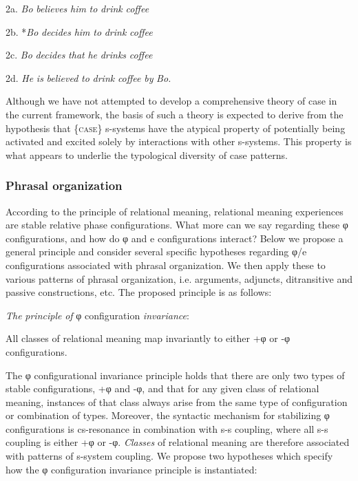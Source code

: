  2a.  \textit{Bo} \textit{believes} \textit{him} \textit{to} \textit{drink} \textit{coffee}

  2b.  *\textit{Bo} \textit{decides} \textit{him} \textit{to} \textit{drink} \textit{coffee}

  2c.  \textit{Bo} \textit{decides} \textit{that} \textit{he} \textit{drinks} \textit{coffee}

  2d.   \textit{He} \textit{is} \textit{believed} \textit{to} \textit{drink} \textit{coffee} \textit{by} \textit{Bo.}

  Although we have not attempted to develop a comprehensive theory of case in the current framework, the basis of such a theory is expected to derive from the hypothesis that \{\textsc{case}\} s-systems have the atypical property of potentially being activated and excited solely by interactions with other s-systems. This property is what appears to underlie the typological diversity of case patterns. 

\subsubsection{Phrasal organization}

According to the principle of relational meaning, relational meaning experiences are stable relative phase configurations. What more can we say regarding these φ configurations, and how do φ and e configurations interact? Below we propose a general principle and consider several specific hypotheses regarding φ/e configurations associated with phrasal organization. We then apply these to various patterns of phrasal organization, i.e. arguments, adjuncts, ditransitive and passive constructions, etc. The proposed principle is as follows:

\textit{The} \textit{principle} \textit{of} φ configuration \textit{invariance}: 

  All classes of relational meaning map invariantly to either +φ or -φ configurations. 

  The φ configurational invariance principle holds that there are only two types of stable configurations, +φ and -φ, and that for any given class of relational meaning, instances of that class always arise from the same type of configuration or combination of types. Moreover, the syntactic mechanism for stabilizing φ configurations is cs-resonance in combination with s-s coupling, where all s-s coupling is either +φ or -φ. \textit{Classes} of relational meaning are therefore associated with patterns of s-system coupling. We propose two hypotheses which specify how the φ configuration invariance principle is instantiated:

